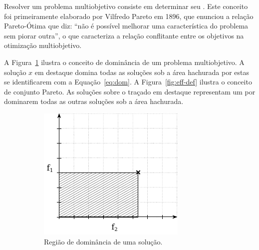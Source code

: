 Resolver um problema multiobjetivo consiste em determinar seu \paretoset{}.
Este conceito foi primeiramente elaborado por Vilfredo Pareto em 1896, que
enunciou a relação Pareto-Ótima que diz: ``não é possível melhorar uma característica
do problema sem piorar outra'', o que caracteriza a relação conflitante entre os
objetivos na otimização multiobjetivo.

A Figura~\ref{fig:dom-def} ilustra o conceito de dominância de um problema multiobjetivo.
A solução $x$ em destaque domina todas as soluções sob a área hachurada
por estas se identificarem com a Equação~\ref{eq:dom}.
A Figura~\ref{fig:eff-def} ilustra o conceito de conjunto Pareto.
As soluções sobre o traçado em destaque representam um \paretoset{} por
dominarem todas as outras soluções sob a área hachurada.

\begin{figure}[h]
    \centering
    \begin{subfigure}[t]{0.3\textwidth}
        \includegraphics[width=\textwidth]{img/mokp/dom-def}
        \caption{Região de dominância de uma solução.}
        \label{fig:dom-def}
    \end{subfigure}
    \qquad
    \begin{subfigure}[t]{0.3\textwidth}

\end{subfigure}
\end{figure}
